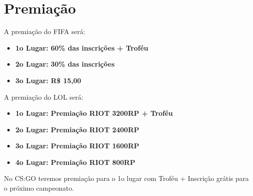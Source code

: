 \section{Premiação}

A premiação do FIFA será:
\begin{itemize}
	\item \textbf{1o Lugar: 60\% das inscrições + Troféu}
    \item \textbf{2o Lugar: 30\% das inscrições}
    \item \textbf{3o Lugar: R\$ 15,00}
\end{itemize}

A premiação do LOL será:
\begin{itemize}
	\item \textbf{1o Lugar: Premiação RIOT 3200RP + Troféu}
    \item \textbf{2o Lugar: Premiação RIOT 2400RP}
    \item \textbf{3o Lugar: Premiação RIOT 1600RP}
    \item \textbf{4o Lugar: Premiação RIOT 800RP}
\end{itemize}

No CS:GO teremos premiação para o 1o lugar com Troféu + Inscrição grátis para o próximo campeonato.
